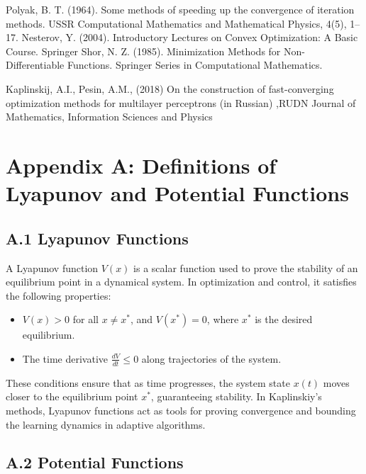 \documentclass[12pt]{article}
\begin{document}
\begin{thebibliography}{9}
Polyak, B. T. (1964). Some methods of speeding up the convergence of iteration methods. USSR Computational Mathematics and Mathematical Physics, 4(5), 1–17.
Nesterov, Y. (2004). Introductory Lectures on Convex Optimization: A Basic Course. Springer
Shor, N. Z. (1985). Minimization Methods for Non-Differentiable Functions. Springer Series in Computational Mathematics.

 Kaplinskij, A.I., Pesin, A.M., (2018) On the construction of fast-converging optimization methods for multilayer perceptrons (in Russian) ,RUDN Journal of Mathematics, Information Sciences and Physics

\end{thebibliography}

\section*{Appendix A: Definitions of Lyapunov and Potential Functions}

\subsection*{A.1 Lyapunov Functions}

A Lyapunov function \( V(x) \) is a scalar function used to prove the stability of an equilibrium point in a dynamical system. In optimization and control, it satisfies the following properties:
\begin{itemize}
  \item \( V(x) > 0 \) for all \( x \neq x^* \), and \( V(x^*) = 0 \), where \( x^* \) is the desired equilibrium.
  \item The time derivative \( \frac{dV}{dt} \leq 0 \) along trajectories of the system.
\end{itemize}
These conditions ensure that as time progresses, the system state \( x(t) \) moves closer to the equilibrium point \( x^* \), guaranteeing stability. In Kaplinskiy’s methods, Lyapunov functions act as tools for proving convergence and bounding the learning dynamics in adaptive algorithms.

\subsection*{A.2 Potential Functions}
\end{document}
